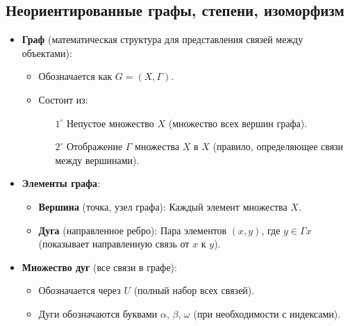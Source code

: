 \subsection{Неориентированные графы, степени, изоморфизм}

\begin{itemize}

\item \textbf{Граф} (математическая структура для представления связей между объектами):

\begin{itemize}

\item Обозначается как $G = (X, \Gamma)$.

\item Состоит из:

\begin{enumerate}

\item[\(1^\circ\)] Непустое множество $X$ (множество всех вершин графа).

\item[\(2^\circ\)] Отображение $\Gamma$ множества $X$ в $X$ (правило, определяющее связи между вершинами).

\end{enumerate}

\end{itemize}

\item \textbf{Элементы графа}:

\begin{itemize}

\item \textbf{Вершина} (точка, узел графа): Каждый элемент множества $X$.

\item \textbf{Дуга} (направленное ребро): Пара элементов $(x, y)$, где $y \in \Gamma x$ (показывает направленную связь от $x$ к $y$).

\end{itemize}

\item \textbf{Множество дуг} (все связи в графе):

\begin{itemize}

\item Обозначается через $U$ (полный набор всех связей).

\item Дуги обозначаются буквами $\alpha$, $\beta$, $\omega$ (при необходимости с индексами).

\end{itemize}

\end{itemize}

